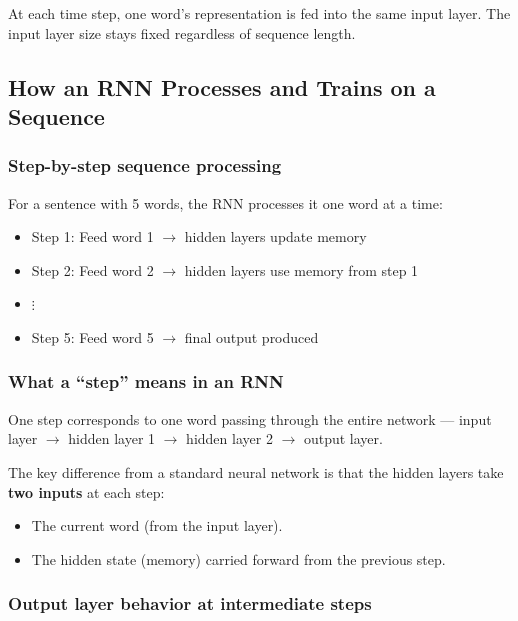 At each time step, one word's representation is fed into the same input layer.
The input layer size stays fixed regardless of sequence length.

\subsection{How an RNN Processes and Trains on a Sequence}

\subsubsection{Step-by-step sequence processing}

For a sentence with 5 words, the RNN processes it one word at a time:
\begin{itemize}
    \item Step 1: Feed word 1 $\to$ hidden layers update memory
    \item Step 2: Feed word 2 $\to$ hidden layers use memory from step 1
    \item $\vdots$
    \item Step 5: Feed word 5 $\to$ final output produced
\end{itemize}

\subsubsection{What a ``step'' means in an RNN}

One step corresponds to one word passing through the entire network --- input layer
$\rightarrow$ hidden layer 1 $\rightarrow$ hidden layer 2 $\rightarrow$ output layer.

The key difference from a standard neural network is that the hidden layers take
\textbf{two inputs} at each step:
\begin{itemize}
    \item The current word (from the input layer).
    \item The hidden state (memory) carried forward from the previous step.
\end{itemize}

\subsubsection{Output layer behavior at intermediate steps}

